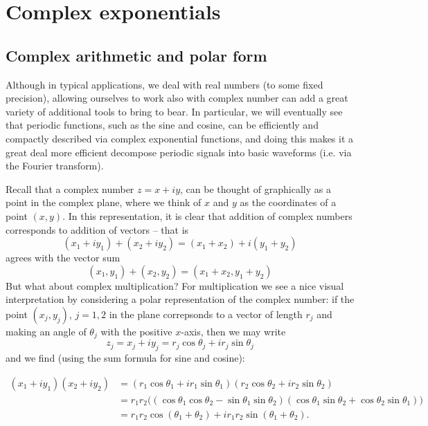 \documentclass[12pt]{report}
\theoremstyle{plain}
\begin{document}

\appendix

\chapter{Complex exponentials}

\section{Complex arithmetic and polar form}

Although in typical applications, we deal with real numbers (to some fixed precision), allowing ourselves to work also with complex number can add a great variety of additional tools to bring to bear. In particular, we will eventually see that periodic functions, such as the sine and cosine, can be efficiently and compactly described via complex exponential functions, and doing this makes it a great deal more efficient decompose periodic signals into basic waveforms (i.e. via the Fourier transform).

Recall that a complex number $z = x + iy$, can be thought of graphically as a point in the complex plane, where we think of $x$ and $y$ as the coordinates of a point $(x, y)$. In this representation, it is clear that addition of complex numbers corresponds to addition of vectors -- that is
\[ (x_1 + i y_1) + (x_2 + i y_2) = (x_1 + x_2) + i (y_1 + y_2)\]
agrees with the vector sum
\[ (x_1, y_1) + (x_2, y_2) = (x_1 + x_2, y_1 + y_2) \]
But what about complex multiplication? For multiplication we see a nice visual interpretation by considering a polar representation of the complex number: if the point $(x_j, y_j)$, $j = 1, 2$ in the plane correpsonds to a vector of length $r_j$ and making an angle of $\theta_j$ with the positive $x$-axis, then we may write
\[z_j = x_j + i y_j = r_j \cos \theta_j + i r_j \sin \theta_j \]
and we find (using the sum formula for sine and cosine):

\begin{align} \label{angles add}
(x_1 + i y_1)(x_2 + i y_2) &= (r_1 \cos \theta_1 + i r_1 \sin \theta_1)(r_2 \cos \theta_2 + i r_2 \sin \theta_2) \\ &= r_1 r_2 \Big( (\cos \theta_1 \cos \theta_2 - \sin \theta_1 \sin \theta_2) (\cos \theta_1 \sin \theta_2 + \cos \theta_2 \sin \theta_1 )\Big) \\ &= r_1 r_2 \cos (\theta_1 + \theta_2) + i r_1 r_2 \sin (\theta_1 + \theta_2).
\end{align}
\end{document}
